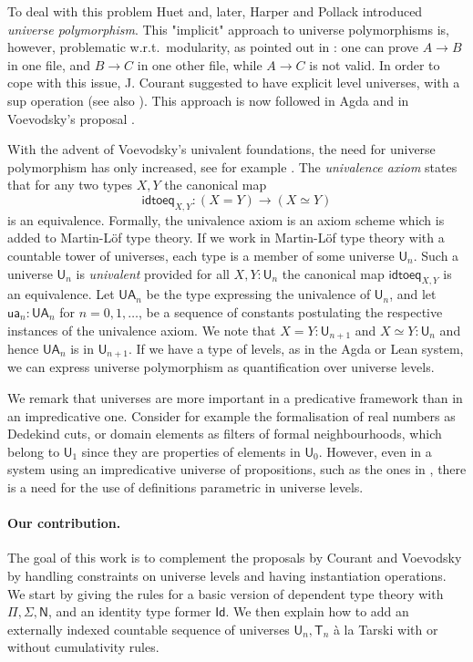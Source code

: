 \documentclass[11pt,a4paper]{article}
\theoremstyle{definition}
\newcommand{\Id}{\mathsf{Id}}
\def\NN{\mathsf{N}}
\def\UU{\mathsf{U}}
\newcommand{\T}{\mathsf{T}}
\newcommand{\idtoeq}{\mathsf{idtoeq}}
\newcommand{\ua}{\mathsf{ua}}
\newcommand{\UA}{\mathsf{UA}}
\begin{document}
 To deal with this problem Huet \cite{Huet87} and, later,
 Harper and Pollack \cite{HarperP91} introduced {\em universe polymorphism}.
 This "implicit" approach to universe polymorphisms is, however, problematic 
 w.r.t.\ modularity, as pointed out in \cite{Courant02,Simpson04}: 
 one can prove $A\rightarrow B$ in one file, and $B\rightarrow C$ in one other file, while
$A\rightarrow C$ is not valid. In order to cope with this issue, J. Courant \cite{Courant02}
suggested to have explicit level universes, with a sup operation (see also \cite{herbelin05}).
This approach is now followed in Agda and in Voevodsky's proposal \cite{VV}.

With the advent of Voevodsky's univalent foundations, the need for universe polymorphism 
has only increased, see for example \cite{VV}. 
The {\em univalence axiom} states that for any two types $X,Y$ the canonical map
$$
\idtoeq_{X,Y} : (X=Y)\to (X\simeq Y)
$$
is an equivalence.
Formally, the univalence axiom is an axiom scheme which is added to Martin-Löf type theory. 
If we work in Martin-Löf type theory with a countable tower of universes, 
each type is a member of some universe $\UU_n$. 
Such a universe $\UU_n$ is {\em univalent} provided for all $X,Y : \UU_n$ the 
canonical map $\idtoeq_{X,Y}$ is an equivalence. 
Let $\UA_n$ be the type expressing the univalence of $\UU_n$, and let
$\ua_n : \UA_n$ for $n = 0,1,\ldots$, be a sequence of constants postulating 
the respective instances of the univalence axiom. 
We note that $X = Y : \UU_{n+1}$ and $X\simeq Y : \UU_n$ and hence $\UA_n$ is in $\UU_{n+1}$.
If we have a type of levels, as in the Agda or Lean system,
we can express universe polymorphism as quantification over universe levels.

We remark that universes are more important in a predicative framework 
than in an impredicative one.
Consider for example the formalisation of real numbers as Dedekind cuts, 
or domain elements as filters of formal neighbourhoods, 
which belong to $\UU_1$ since they are properties of elements in $\UU_0$.
However, even in a system using an impredicative universe of propositions,
such as the ones in \cite{Huet87,moura:lean}, there is a need for the use of 
definitions parametric in universe levels.

\paragraph{Our contribution.}
  The goal of this work is to complement the proposals by Courant \cite{Courant02}
  and Voevodsky \cite{VV} by handling constraints on universe levels 
  and having instantiation operations.
  We start by giving the rules for a basic version of dependent type theory with
  $\Pi, \Sigma, \NN$, and an identity type former $\Id$.
  We then explain how to add an externally indexed countable sequence of 
  universes $\UU_n, \T_n$ \`a la Tarski with or without cumulativity rules. 
  
\end{document}
